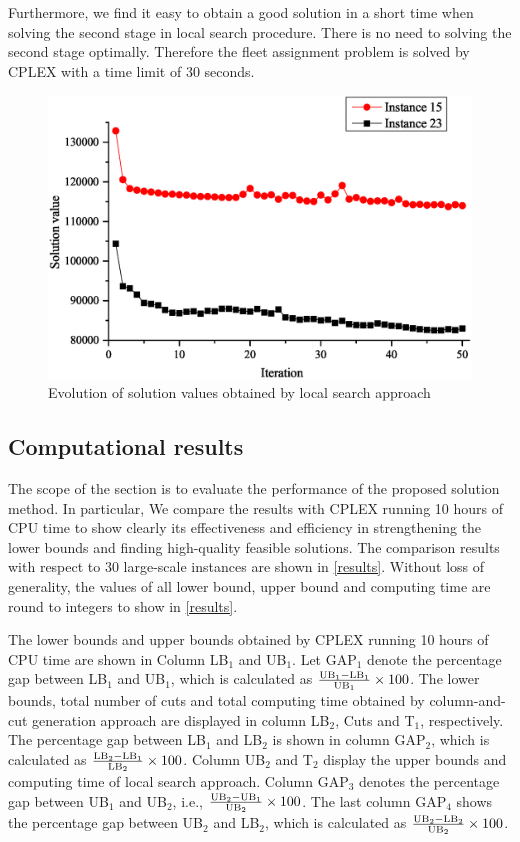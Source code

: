 \documentclass[11pt,nonblindrev,fleqn]{article}
\begin{document}
Furthermore, we find it easy to obtain a good solution in a short time when solving the second stage in local search procedure. There is no need to solving the second stage optimally. Therefore the fleet assignment problem is solved by CPLEX with a time limit of 30 seconds.
\begin{figure}[H]
\setlength{\abovecaptionskip}{-5pt}
\setlength{\belowcaptionskip}{-5pt}
\centering
\includegraphics[width=0.8\linewidth]{F4.eps}
\caption{Evolution of solution values obtained by local search approach}
\label{Evolution}
\end{figure}

\subsection{Computational results}
The scope of the section is to evaluate the performance of the proposed solution method. In particular, We compare the results with CPLEX running 10 hours of CPU time to show clearly its effectiveness and efficiency in strengthening the lower bounds and finding high-quality feasible solutions. The comparison results with respect to 30 large-scale instances are shown in \autoref{results}. Without loss of generality, the values of all lower bound, upper bound and computing time are round to integers to show in \autoref{results}.

The lower bounds and upper bounds obtained by CPLEX running 10 hours of CPU time are shown in Column LB$_1$ and UB$_1$. Let GAP$_1$ denote the percentage gap between LB$_1$ and UB$_1$, which is calculated as $\rm \frac{UB_1 - LB_1}{UB_1}\times 100$. The lower bounds, total number of cuts and total computing time obtained by column-and-cut generation approach are displayed in column LB$_2$, Cuts and T$_1$, respectively. The percentage gap between LB$_1$ and LB$_2$ is shown in column GAP$_2$, which is calculated as $\rm \frac{LB_2 - LB_1}{LB_2}\times 100$. Column UB$_2$ and T$_2$ display the upper bounds and computing time of local search approach. Column GAP$_3$ denotes the percentage gap between UB$_1$ and UB$_2$, i.e., $\rm \frac{UB_2 - UB_1}{UB_2}\times 100$. The last column GAP$_4$ shows the percentage gap between UB$_2$ and LB$_2$, which is calculated as $\rm \frac{UB_2 - LB_2}{UB_2}\times 100$.
\end{document}
